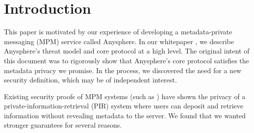 \section{Introduction}
\label{sec:purpose}
This paper is motivated by our experience of developing a metadata-private messaging (MPM) service called Anysphere. In our whitepaper \cite[Section 3]{whitepaper}, we describe Anysphere's threat model and core protocol at a high level. The original intent of this document was to rigorously show that Anysphere’s core protocol satisfies the metadata privacy we promise. In the process, we discovered the need for a new security definition, which may be of independent interest.

Existing security proofs of MPM systems (such as \cite{corrigan2010dissent, corrigan2015riposte, angel2016unobservable, ahmad2021addra}) have shown the privacy of a private-information-retrieval (PIR) system where users can deposit and retrieve information without revealing metadata to the server. We found that we wanted stronger guarantees for several reasons.
